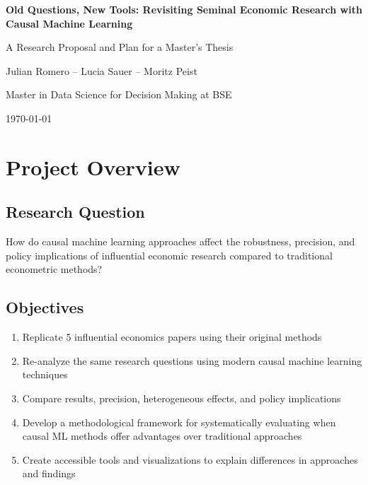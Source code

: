 \documentclass[12pt,a4paper]{article}
\begin{document}
\begin{titlepage}
    \centering
    \vspace*{1cm}
    {\LARGE \textbf{Old Questions, New Tools: Revisiting Seminal Economic Research with Causal Machine Learning}\par}
    \vspace{1.5cm}
    {\Large A Research Proposal and Plan for a Master's Thesis\par}
    \vspace{0.5cm}
    {\large Julian Romero -- Lucia Sauer -- Moritz Peist\par}
    \vspace{0.5cm}
    {Master in Data Science for Decision Making at BSE\par}
    \vfill
    {\large \today\par}
    \vfill
\end{titlepage}

\tableofcontents
\newpage

\section{Project Overview}

\subsection{Research Question}
How do causal machine learning approaches affect the robustness, precision, and policy implications of influential economic research compared to traditional econometric methods?

\subsection{Objectives}
\begin{enumerate}
    \item Replicate 5 influential economics papers using their original methods
    \item Re-analyze the same research questions using modern causal machine learning techniques
    \item Compare results, precision, heterogeneous effects, and policy implications
    \item Develop a methodological framework for systematically evaluating when causal ML methods offer advantages over traditional approaches
    \item Create accessible tools and visualizations to explain differences in approaches and findings
\end{enumerate}
\end{document}
